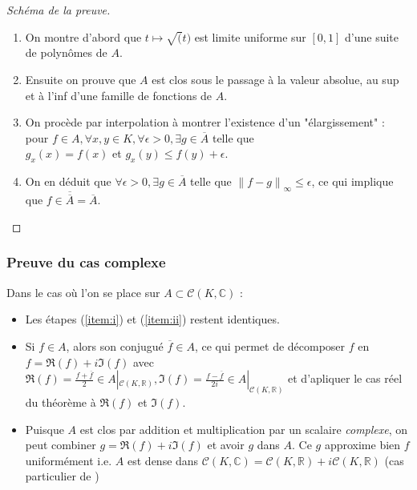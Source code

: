 \documentclass[
	10pt, %
	xcolor={svgnames}
]{beamer}
\begin{document}
\begin{frame}
\begin{proof}[Schéma de la preuve]
	\begin{enumerate}
		\item On montre d'abord que \( t \mapsto \sqrt(t) \) est limite uniforme sur \( [0,1] \) d'une suite de polynômes de \( A \). \label{item:i}
		\item Ensuite on prouve que \( A \) est clos sous le passage à la valeur absolue, au sup et à l'inf d'une famille de fonctions de \( A \). \label{item:ii}
		\item On procède par interpolation à montrer l'existence d'un "élargissement" : pour \( f \in A, \forall x,y \in K, \forall \epsilon > 0, \exists g \in \overline{A} \) telle que \\\( g_{x}(x) = f(x) \) et \( g_{x}(y) \leq f(y) + \epsilon \). \label{item:iii}
		\item On en déduit que \( \forall\epsilon > 0, \exists g \in \overline{A} \) telle que \( {\left\lVert f-g \right\rVert_{\infty}} \le \epsilon \), ce qui implique que \( f \in \overline{\overline{A}} = \overline{A} \). \label{item:iv}
	\end{enumerate}	
\end{proof}
\end{frame}


\begin{frame}
	\frametitle{Preuve du cas complexe}
\par Dans le cas où l'on se place sur \( A \subset \mathcal{C}(K,\mathbb{C}) \) :
\begin{itemize}
	\item Les étapes (\ref{item:i}) et (\ref{item:ii}) restent identiques.
	\item Si \( f \in A \), alors son conjugué \( \overline{f} \in A \), ce qui permet de décomposer \( f \) en \( f = \Re(f) + i\Im(f) \) avec \( \Re(f) = \frac{f + \overline{f}}{2}\in A|_{\mathcal{C}(K,\mathbb{R})}, \Im(f) = \frac{f - \overline{f}}{2i} \in A|_{\mathcal{C}(K,\mathbb{R})} \) et d'apliquer le cas réel du théorème à \( \Re(f) \) et \( \Im(f) \).
	\item Puisque \( A \) est clos par addition et multiplication par un scalaire \textit{complexe}, on peut combiner \( g = \Re(f) + i\Im(f) \) et avoir \( g \) dans \( A \). Ce \( g \) approxime bien \( f \) uniformément i.e. \( A \) est dense dans \( \mathcal{C}(K,\mathbb{C}) = \mathcal{C}(K,\mathbb{R}) + i\mathcal{C}(K,\mathbb{R}) \) (cas particulier de \cite{stephenson1968spaces})

\end{itemize}
\end{frame}
\end{document}
